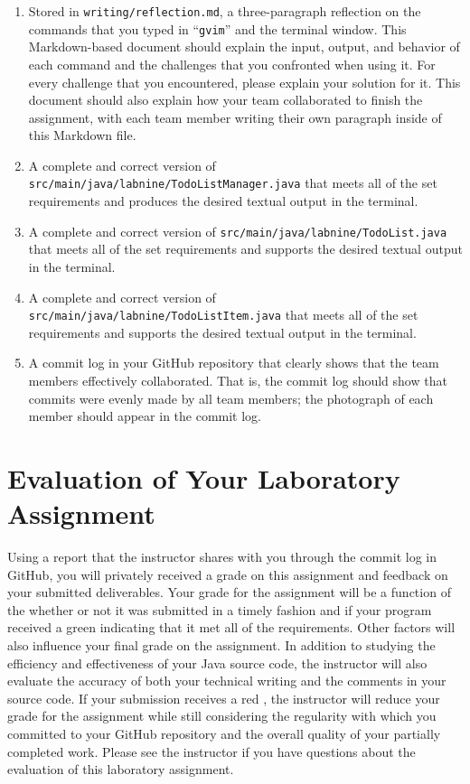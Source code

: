 \documentclass[11pt]{article}
\newcommand{\mainprogramsource}{\lstinline{src/main/java/labnine/TodoListManager.java}}
\newcommand{\secondprogramsource}{\lstinline{src/main/java/labnine/TodoList.java}}
\newcommand{\thirdprogramsource}{\lstinline{src/main/java/labnine/TodoListItem.java}}
\newcommand{\reflection}{\lstinline{writing/reflection.md}}
\newcommand{\command}[1]{``\lstinline{#1}''}
\newcommand{\checkmark}{\ding{51}}
\newcommand{\naughtmark}{\ding{55}}
\begin{document}
\begin{enumerate}

  \setlength{\itemsep}{0in}

\item Stored in \reflection{}, a three-paragraph reflection on the commands that you typed in \command{gvim} and the
  terminal window. This Markdown-based document should explain the input, output, and behavior of each command and the
  challenges that you confronted when using it. For every challenge that you encountered, please explain your solution
  for it. This document should also explain how your team collaborated to finish the assignment, with each team member
  writing their own paragraph inside of this Markdown file.

\item A complete and correct version of \mainprogramsource{} that meets all of the set requirements and produces the
  desired textual output in the terminal.

\item A complete and correct version of \secondprogramsource{} that meets all of the set requirements and supports the
  desired textual output in the terminal.

\item A complete and correct version of \thirdprogramsource{} that meets all of the set requirements and supports the
  desired textual output in the terminal.

\item A commit log in your GitHub repository that clearly shows that the team members effectively collaborated. That is,
  the commit log should show that commits were evenly made by all team members; the photograph of each member should
  appear in the commit log.

\end{enumerate}

\section*{Evaluation of Your Laboratory Assignment}

Using a report that the instructor shares with you through the commit log in GitHub, you will privately received a grade
on this assignment and feedback on your submitted deliverables. Your grade for the assignment will be a function of the
whether or not it was submitted in a timely fashion and if your program received a green \checkmark{} indicating that it
met all of the requirements. Other factors will also influence your final grade on the assignment. In addition to
studying the efficiency and effectiveness of your Java source code, the instructor will also evaluate the accuracy of
both your technical writing and the comments in your source code. If your submission receives a red \naughtmark{}, the
instructor will reduce your grade for the assignment while still considering the regularity with which you committed to
your GitHub repository and the overall quality of your partially completed work. Please see the instructor if you have
questions about the evaluation of this laboratory assignment.
\end{document}
